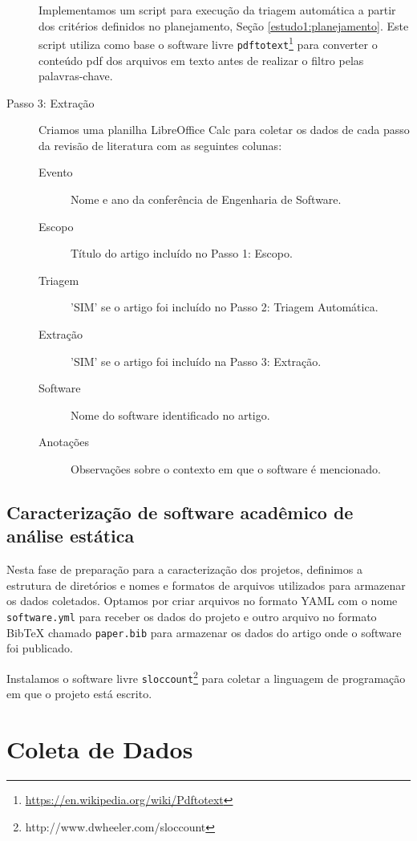 \begin{description}
Implementamos um script para execução da triagem automática a partir dos
critérios definidos no planejamento, Seção \ref{estudo1:planejamento}.
Este script utiliza como base o software livre
\texttt{pdftotext}\footnote{\url{https://en.wikipedia.org/wiki/Pdftotext}} para
converter o conteúdo pdf dos arquivos em texto antes de realizar o filtro pelas
palavras-chave.

  \item [Passo 3: Extração]

Criamos uma planilha LibreOffice Calc para coletar os dados de cada passo da
revisão de literatura com as seguintes colunas:

\begin{description}
  \item[Evento] Nome e ano da conferência de Engenharia de Software.
  \item[Escopo] Título do artigo incluído no Passo 1: Escopo.
  \item[Triagem] 'SIM' se o artigo foi incluído no Passo 2: Triagem Automática.
  \item[Extração] 'SIM' se o artigo foi incluído na Passo 3: Extração.
  \item[Software] Nome do software identificado no artigo.
  \item[Anotações] Observações sobre o contexto em que o software é mencionado.
\end{description}

\end{description}

\subsection{Caracterização de software acadêmico de análise estática}

Nesta fase de preparação para a caracterização dos projetos, definimos a
estrutura de diretórios e nomes e formatos de arquivos utilizados para
armazenar os dados coletados. Optamos por criar arquivos no formato YAML com o
nome \texttt{software.yml} para receber os dados do projeto e outro arquivo no
formato BibTeX chamado \texttt{paper.bib} para armazenar os dados do artigo
onde o software foi publicado.

Instalamos o software livre
\texttt{sloccount}\footnote{http://www.dwheeler.com/sloccount} para coletar a
linguagem de programação em que o projeto está escrito.


\section{Coleta de Dados} \label{estudo1:coleta} %

